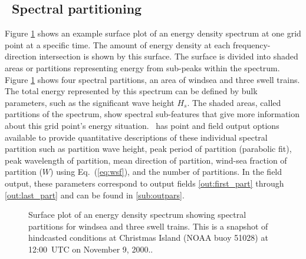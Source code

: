 \vssub
\subsection{~Spectral partitioning} \label{sub:num_part}

\noindent
Figure \ref{fig:partitions} shows an example surface plot of an energy density
spectrum at one grid point at a specific time.  The amount of energy density
at each frequency-direction intersection is shown by this surface.  The
surface is divided into shaded areas or partitions representing energy from
sub-peaks within the spectrum.  Figure \ref{fig:partitions} shows four
spectral partitions, an area of windsea and three swell trains.  The total
energy represented by this spectrum can be defined by bulk parameters, such as
the significant wave height $H_s$. The shaded areas, called partitions of the
spectrum, show spectral sub-features that give more information about this
grid point's energy situation.  \ws\ has point and field output options
available to provide quantitative descriptions of these individual spectral
partition such as partition wave height, peak period of partition (parabolic
fit), peak wavelength of partition, mean direction of partition, wind-sea
fraction of partition ($W$) using Eq.~(\ref{eq:wsf}), and the number of
partitions.  In the field output, these parameters correspond to output fields
\ref{out:first_part} through \ref{out:last_part} and can be found in
\para\ref{sub:outpars}.

\begin{figure} \begin{center}
\caption{Surface plot of an energy density spectrum showing spectral
         partitions for windsea and three swell trains.  This is a snapshot of
         hindcasted conditions at Christmas Island (NOAA buoy 51028) at
         12:00~UTC on November 9, 2000..}
         \label{fig:partitions} \botline
\end{center}
\end{figure}

